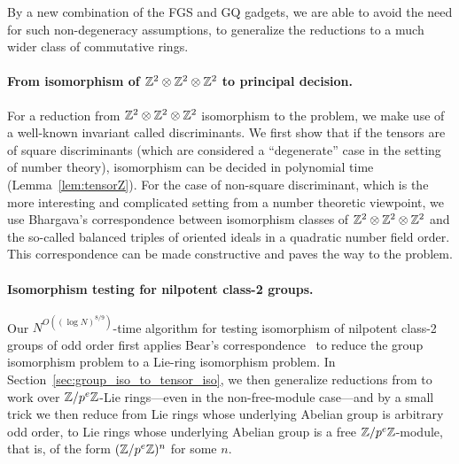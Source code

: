 By a new combination of the FGS and GQ gadgets, we are able to avoid the need for such non-degeneracy assumptions, to generalize the reductions to a much wider class of commutative rings.

\paragraph{From isomorphism of $\mathbb{Z}^2\otimes\mathbb{Z}^2\otimes\mathbb{Z}^2$ to principal decision.} For a reduction from $\mathbb{Z}^2\otimes\mathbb{Z}^2\otimes\mathbb{Z}^2$ isomorphism to the  problem, we make use of a well-known invariant called discriminants. We first show that if the tensors are of square discriminants (which are considered a ``degenerate'' case in the setting of number theory), isomorphism can be decided in polynomial time (Lemma~\ref{lem:tensorZ}). For the case of non-square discriminant, which is the more interesting and complicated setting from a number theoretic viewpoint, we use Bhargava's correspondence between isomorphism classes of $\mathbb{Z}^2\otimes\mathbb{Z}^2\otimes\mathbb{Z}^2$ and the so-called balanced triples of oriented ideals in a quadratic number field order. This correspondence can be made constructive and paves the way to the  problem. 

\paragraph{Isomorphism testing for nilpotent class-2 groups.} 
Our $N^{O((\log N)^{8/9})}$-time algorithm for testing isomorphism of nilpotent class-2 groups of odd order first applies Bear's correspondence~\cite{Bae38, khukhro,naik} to reduce the group isomorphism problem to a Lie-ring isomorphism problem. In Section~\ref{sec:group_iso_to_tensor_iso}, we then generalize reductions from \cite{TI4} to work over $\mathbb{Z}/p^e \mathbb{Z}$-Lie rings---even in the non-free-module case---and by a small trick we then reduce from Lie rings whose underlying Abelian group is arbitrary odd order, to Lie rings whose underlying Abelian group is a free $\mathbb{Z}/p^e \mathbb{Z}$-module, that is, of the form $(\mathbb{Z}/p^e \mathbb{Z})^n$ for some $n$. 

